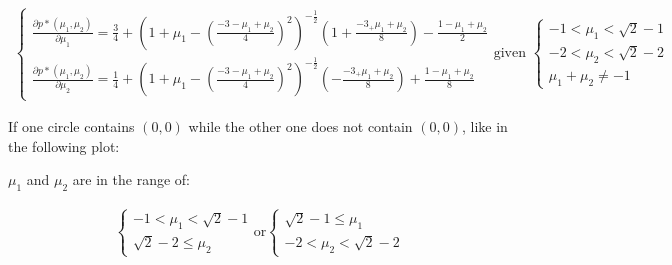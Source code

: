 \documentclass[11pt, letterpaper, titlepage]{article}
\begin{document}
\begin{enumerate}
\begin{enumerate}
        \begin{gather*}
            \begin{cases}
                \frac{\partial p*(\mu_1, \mu_2)}{\partial \mu_1} = \frac{3}{4} + (1 + \mu_1 - (\frac{- 3 - \mu_1 + \mu_2}{4})^2)^{- \frac{1}{2}}(1 + \frac{-3 _+ \mu_1 + \mu_2}{8}) - \frac{1 - \mu_1 + \mu_2}{2} \\
                \frac{\partial p*(\mu_1, \mu_2)}{\partial \mu_2} = \frac{1}{4} +  (1 + \mu_1 - (\frac{- 3 - \mu_1 + \mu_2}{4})^2)^{- \frac{1}{2}} (-\frac{-3 _+ \mu_1 + \mu_2}{8}) + \frac{1 - \mu_1 + \mu_2}{8}
            \end{cases}
            \text{given }
            \begin{cases}
                - 1 < \mu_1 < \sqrt{2} - 1 \\
                - 2 < \mu_2 < \sqrt{2} - 2 \\
                \mu_1 + \mu_2 \neq -1
            \end{cases}
        \end{gather*}
        
        If one circle contains $(0, 0)$ while the other one does not contain $(0, 0)$, like in the following plot:
        
        \begin{center}
        \def\circlee{(1, 1) circle (1.2)}
        \def\circlef{(1, -1) circle (2)}
        \end{center}
        
        $\mu_1$ and $\mu_2$ are in the range of:
        
        \begin{gather*}
            \begin{cases}
                - 1 < \mu_1 < \sqrt{2} - 1 \\
                \sqrt{2} - 2 \leq \mu_2
            \end{cases}
            \text{or}
            \begin{cases}
                 \sqrt{2} - 1 \leq \mu_1\\
                 - 2 < \mu_2 < \sqrt{2} - 2
            \end{cases}
        \end{gather*}
        

\end{enumerate}
\end{enumerate}
\end{document}
